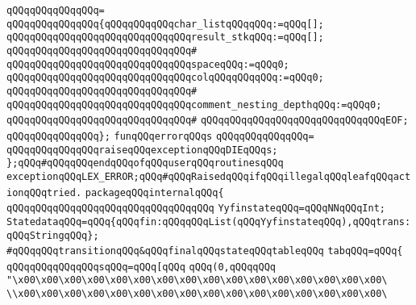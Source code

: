 \verb|qQQqqQQqqQQqqQQq=|\newline
\verb|qQQqqQQqqQQqqQQq{qQQqqQQqqQQqchar_listqQQqqQQq:=qQQq[];|\newline
\verb|qQQqqQQqqQQqqQQqqQQqqQQqqQQqqQQqresult_stkqQQq:=qQQq[];|\newline
\verb|qQQqqQQqqQQqqQQqqQQqqQQqqQQqqQQq#|\newline
\verb|qQQqqQQqqQQqqQQqqQQqqQQqqQQqqQQqspaceqQQq:=qQQq0;|\newline
\verb|qQQqqQQqqQQqqQQqqQQqqQQqqQQqqQQqcolqQQqqQQqqQQq:=qQQq0;|\newline
\verb|qQQqqQQqqQQqqQQqqQQqqQQqqQQqqQQq#|\newline
\verb|qQQqqQQqqQQqqQQqqQQqqQQqqQQqqQQqcomment_nesting_depthqQQq:=qQQq0;|\newline
\verb|qQQqqQQqqQQqqQQqqQQqqQQqqQQqqQQq#|\newline
\verb|qQQqqQQqqQQqqQQqqQQqqQQqqQQqqQQqEOF;|\newline
\verb|qQQqqQQqqQQqqQQq};|\newline
\newline
\verb|funqQQqerrorqQQqs|\newline
\verb|qQQqqQQqqQQqqQQq=|\newline
\verb|qQQqqQQqqQQqqQQqraiseqQQqexceptionqQQqDIEqQQqs;|\newline
\newline
\verb|};qQQq#qQQqqQQqendqQQqofqQQquserqQQqroutinesqQQq|\newline
\verb|exceptionqQQqLEX_ERROR;qQQq#qQQqRaisedqQQqifqQQqillegalqQQqleafqQQqactionqQQqtried.|\newline
\verb|packageqQQqinternalqQQq{|\newline
\verb|qQQqqQQqqQQqqQQqqQQqqQQqqQQqqQQqqQQq|\newline
\newline
\verb|YyfinstateqQQq=qQQqNNqQQqInt;|\newline
\verb|StatedataqQQq=qQQq{qQQqfin:qQQqqQQqList(qQQqYyfinstateqQQq),qQQqtrans:qQQqStringqQQq};|\newline
\verb|#qQQqqQQqtransitionqQQq&qQQqfinalqQQqstateqQQqtableqQQq|\newline
\verb|tabqQQq=qQQq{|\newline
\verb|qQQqqQQqqQQqqQQqsqQQq=qQQq[qQQq|\newline
\verb|qQQq(0,qQQqqQQq|\newline
\verb|"\x00\x00\x00\x00\x00\x00\x00\x00\x00\x00\x00\x00\x00\x00\x00\x00\|\newline
\verb|\\x00\x00\x00\x00\x00\x00\x00\x00\x00\x00\x00\x00\x00\x00\x00\x00\|\newline
